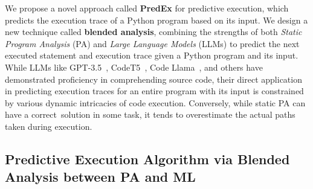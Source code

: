 

We propose a novel approach called {\bf PredEx} for predictive execution, which predicts the execution trace of a Python program based on its input. We design a new technique called {\bf blended analysis}, combining the strengths of both {\em Static Program Analysis} (PA) and {\em Large Language Models} (LLMs) to predict the next executed statement and execution trace given a Python program and its input. While LLMs like GPT-3.5~\cite{GPT3.5}, CodeT5~\cite{wang2023codet5}, Code Llama~\cite{code_llama}, 
and others have demonstrated proficiency in comprehending source code,
their direct application in predicting execution traces for an entire
program with its input is constrained by various dynamic intricacies
of code execution. Conversely, while static PA can have a
correct~solution in some task, it tends to overestimate the actual
paths taken during execution.

\subsection{Predictive Execution Algorithm via Blended Analysis between PA and ML}

